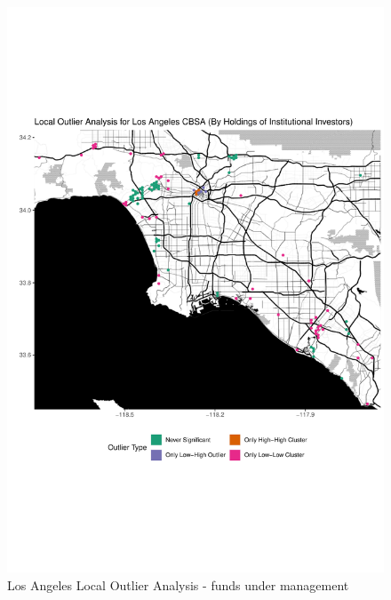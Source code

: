 \begin{figure}
	\centering
	\includegraphics[width=1\linewidth]{Figures/ChapterIV/LA_Money_LO}
	\caption[Los Angeles CBSA Local Outlier Analysis - Funds Under Management 2013-2018]{Los Angeles Local Outlier Analysis - funds under management}
	\label{fig:LAlocaloutlier}
\end{figure}

